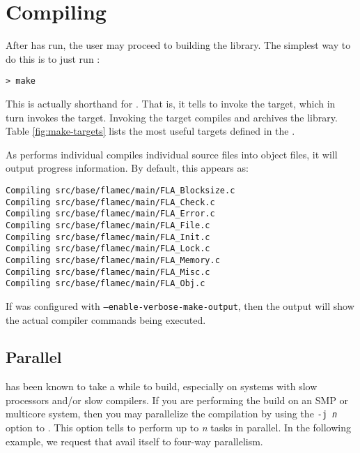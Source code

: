 \section{Compiling}


After \configure has run, the user may proceed to building the library.
The simplest way to do this is to just run \makens:

\begin{Verbatim}[frame=single,framesep=2.5mm,xleftmargin=5mm,commandchars=\\\{\},fontsize=\footnotesize]
> make
\end{Verbatim}

\noindent
This is actually shorthand for \make \allns.
That is, it tells \make to invoke the \all target, which in turn invokes
the \libs target.
Invoking the \libs target compiles and archives the library.
Table \ref{fig:make-targets} lists the most useful \make targets defined
in the \libflame \makefilens.

As \make performs individual compiles individual source files into object
files, it will output progress information.
By default, this appears as:

\begin{Verbatim}[frame=single,framesep=2.5mm,xleftmargin=5mm,commandchars=\\\{\},fontsize=\footnotesize]
Compiling src/base/flamec/main/FLA_Blocksize.c
Compiling src/base/flamec/main/FLA_Check.c
Compiling src/base/flamec/main/FLA_Error.c
Compiling src/base/flamec/main/FLA_File.c
Compiling src/base/flamec/main/FLA_Init.c
Compiling src/base/flamec/main/FLA_Lock.c
Compiling src/base/flamec/main/FLA_Memory.c
Compiling src/base/flamec/main/FLA_Misc.c
Compiling src/base/flamec/main/FLA_Obj.c
\end{Verbatim}

If \libflame was configured with {\tt --enable-verbose-make-output}, then
the output will show the actual compiler commands being executed.

\subsection{Parallel \make}

\libflame has been known to take a while to build, especially on systems
with slow processors and/or slow compilers.
If you are performing the build on an SMP or multicore system, then you
may parallelize the compilation by using the {\tt -j {\em n}} option to
\makens.
This option tells \make to perform up to {\em n} tasks in parallel.
In the following example, we request that \make avail itself to four-way
parallelism.


